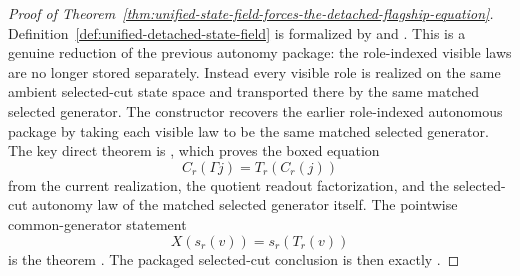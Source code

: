 \begin{proof}[Proof of Theorem~\ref{thm:unified-state-field-forces-the-detached-flagship-equation}]
\label{proof:thm:unified-state-field-forces-the-detached-flagship-equation}
Definition~\ref{def:unified-detached-state-field} is formalized by
 and
. This is a genuine reduction
of the previous autonomy package: the role-indexed visible laws are no longer
stored separately. Instead every visible role is realized on the same ambient
selected-cut state space and transported there by the same matched selected
generator. The constructor
 recovers the
earlier role-indexed autonomous package by taking each visible law to be the
same matched selected generator. The key direct theorem is
, which proves the
boxed equation
\[
C_r(\Gamma j)=T_r(C_r(j))
\]
from the current realization, the quotient readout factorization, and the
selected-cut autonomy law of the matched selected generator itself. The pointwise
common-generator statement
\[ 
X(s_r(v))=s_r(T_r(v))
\]
is the theorem . The
packaged selected-cut conclusion is then exactly
.
\end{proof}

